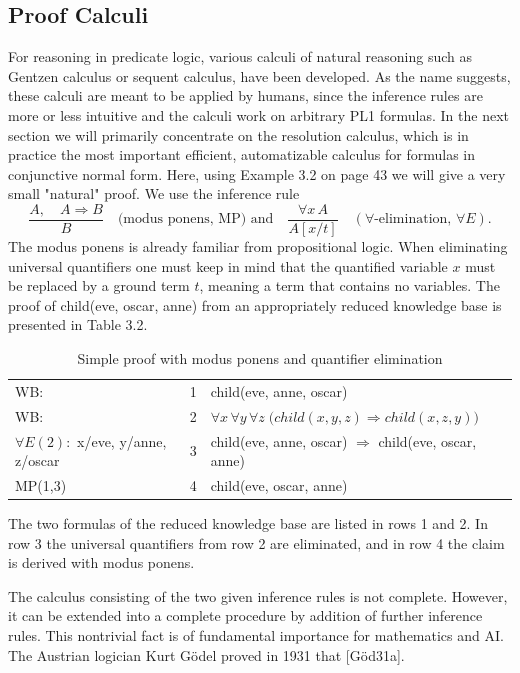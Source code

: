 \documentclass[10pt]{book}
\begin{document}
\subsection{Proof Calculi}
For reasoning in predicate logic, various calculi of natural reasoning such as Gentzen calculus or sequent calculus, have been developed. As the name suggests, these calculi are meant to be applied by humans, since the inference rules are more or less intuitive and the calculi work on arbitrary PL1 formulas. In the next section we will primarily concentrate on the resolution calculus, which is in practice the most important efficient, automatizable calculus for formulas in conjunctive normal form. Here, using Example 3.2 on page 43 we will give a very small "natural" proof. We use the inference rule
$$
\frac{A, \quad A \Rightarrow B}{B}
\quad \text{(modus ponens, MP) and} \quad
\frac{\forall x\, A}{A[x/t]} \quad (\forall\text{-elimination, } \forall E).
$$
The modus ponens is already familiar from propositional logic. When eliminating universal quantifiers one must keep in mind that the quantified variable $x$ must be replaced by a ground term $t$, meaning a term that contains no variables. The proof of child(eve, oscar, anne) from an appropriately reduced knowledge base is presented in Table 3.2.

\begin{table}[ht]
\centering
\caption{Simple proof with modus ponens and quantifier elimination}
\begin{tabular}{lll}
\hline
WB: & 1 & child(eve, anne, oscar) \\
WB: & 2 & $\forall x\,\forall y\,\forall z\;\big(child(x,y,z) \Rightarrow child(x,z,y)\big)$ \\
$\forall E(2):$ x/eve, y/anne, z/oscar & 3 & child(eve, anne, oscar) $\Rightarrow$ child(eve, oscar, anne) \\
MP(1,3) & 4 & child(eve, oscar, anne) \\
\hline
\end{tabular}
\end{table}
The two formulas of the reduced knowledge base are listed in rows 1 and 2. In row 3 the universal quantifiers from row 2 are eliminated, and in row 4 the claim is derived with modus ponens.

The calculus consisting of the two given inference rules is not complete. However, it can be extended into a complete procedure by addition of further inference rules. This nontrivial fact is of fundamental importance for mathematics and AI. The Austrian logician Kurt Gödel proved in 1931 that [Göd31a].
\end{document}
